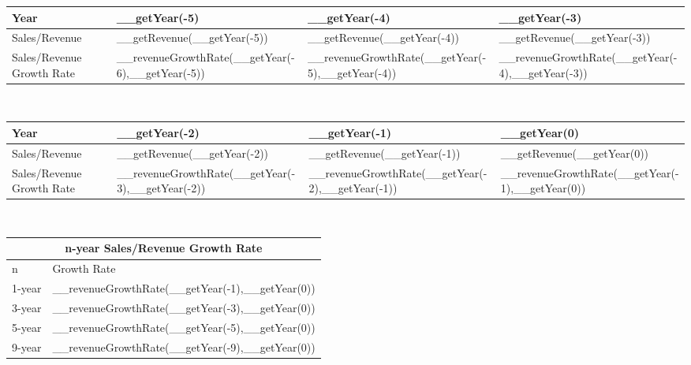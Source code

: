 \begin{tabularx}{\textwidth}{|X|X|X|X|}
 \hline
 Year                                           & __getYear(-5)                                     & __getYear(-4)                                     & __getYear(-3)                                     \\
 \hline
 Sales/Revenue                                  & __getRevenue(__getYear(-5))                       & __getRevenue(__getYear(-4))                       & __getRevenue(__getYear(-3))                       \\
 \rowcolor{lightgray} Sales/Revenue Growth Rate & __revenueGrowthRate(__getYear(-6),__getYear(-5))  & __revenueGrowthRate(__getYear(-5),__getYear(-4))  & __revenueGrowthRate(__getYear(-4),__getYear(-3))  \\
 \hline
\end{tabularx}\\

\begin{tabularx}{\textwidth}{|X|X|X|X|}
 \hline
 Year                                           & __getYear(-2)                                     & __getYear(-1)                                     & __getYear(0)                                     \\
 \hline
 Sales/Revenue                                  & __getRevenue(__getYear(-2))                       & __getRevenue(__getYear(-1))                       & __getRevenue(__getYear(0))                       \\
 \rowcolor{lightgray} Sales/Revenue Growth Rate & __revenueGrowthRate(__getYear(-3),__getYear(-2))  & __revenueGrowthRate(__getYear(-2),__getYear(-1))  & __revenueGrowthRate(__getYear(-1),__getYear(0))  \\
 \hline
\end{tabularx}\\

\begin{tabularx}{\textwidth}{|X|X|}
 \hline
 \multicolumn{2}{|c|}{n-year Sales/Revenue Growth Rate} \\
 \hline
 n & Growth Rate\\
 \hline
 1-year & __revenueGrowthRate(__getYear(-1),__getYear(0)) \\
 3-year & __revenueGrowthRate(__getYear(-3),__getYear(0)) \\
 5-year & __revenueGrowthRate(__getYear(-5),__getYear(0)) \\
 9-year & __revenueGrowthRate(__getYear(-9),__getYear(0)) \\
 \hline
\end{tabularx}

